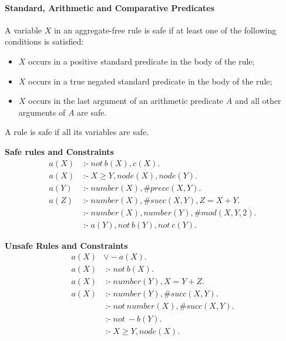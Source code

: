\documentclass[a4paper, titlepage]{article}
\DeclareMathOperator{\leftimpl}{:-}
\begin{document}
\paragraph{Standard, Arithmetic and Comparative Predicates}
A variable $X$ in an aggregate-free rule is safe if at least one 
of the following conditions is satisfied:
\begin{itemize}
\item $X$ occurs in a positive standard predicate in the 
body of the rule;
\item $X$ occurs in a true negated standard predicate in 
the body of the rule;
\item $X$ occurs in the last argument of an arithmetic 
predicate $A$ and all other arguments of $A$ are safe.
\end{itemize}
A rule is safe if all its variables are safe.
\begin{exmp} \textbf{Safe rules and Constraints}
\begin{align*}
a(X)& \leftimpl not \ b(X), c(X). \\
a(X)& \leftimpl X \geq Y, node(X), node(Y).\\
a(Y)& \leftimpl number(X), \#precc(X,Y). \\
a(Z)& \leftimpl number(X), \#succ(X,Y),Z=X+Y.\\
    &\leftimpl number(X), number(Y), \#mod(X,Y,2).\\
    &\leftimpl a(Y), not \ b(Y), not \ c(Y). 
\end{align*}
\end{exmp}

\begin{exmp} \textbf{Unsafe Rules and Constraints}
\begin{align*}
a(X) &\vee -a(X). \\
a(X)&\leftimpl not \ b(X). \\
a(X)&\leftimpl number(Y), X=Y+Z. \\
a(X)&\leftimpl number(Y), \#succ(X,Y). \\
    & \leftimpl not \ number(X), \#succ(X,Y). \\
    & \leftimpl not \ -b(Y).\\
    & \leftimpl X \geq Y, node(X). 
\end{align*}
\end{exmp}
\end{document}
